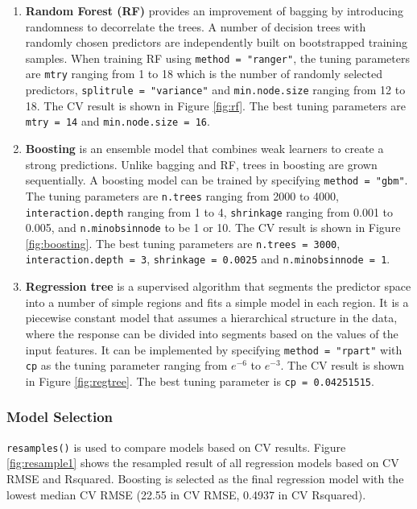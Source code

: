 \documentclass[11pt]{article}
\begin{document}
\begin{enumerate}
\item \textbf{Random Forest (RF)} provides an improvement of bagging by introducing randomness to decorrelate the trees. A number of decision trees with randomly chosen predictors are independently built on bootstrapped training samples. When training RF using \texttt{method = "ranger"}, the tuning parameters are \texttt{mtry} ranging from 1 to 18 which is the number of randomly selected predictors, \texttt{splitrule = "variance"} and \texttt{min.node.size} ranging from 12 to 18. The CV result is shown in Figure \ref{fig:rf}. The best tuning parameters are \texttt{mtry = 14} and \texttt{min.node.size = 16}.

\item \textbf{Boosting} is an ensemble model that combines weak learners to create a strong predictions. Unlike bagging and RF, trees in boosting are grown sequentially. A boosting model can be trained by specifying \texttt{method = "gbm"}. The tuning parameters are \texttt{n.trees} ranging from 2000 to 4000, \texttt{interaction.depth} ranging from 1 to 4, \texttt{shrinkage} ranging from 0.001 to 0.005, and \texttt{n.minobsinnode} to be 1 or 10. The CV result is shown in Figure \ref{fig:boosting}. The best tuning parameters are \texttt{n.trees = 3000}, \texttt{interaction.depth = 3}, \texttt{shrinkage = 0.0025} and \texttt{n.minobsinnode = 1}.

\item \textbf{Regression tree} is a supervised algorithm that segments the predictor space into a number of simple regions and fits a simple model in each region. It is a piecewise constant model that assumes a hierarchical structure in the data, where the response can be divided into segments based on the values of the input features. It can be implemented by specifying \texttt{method = "rpart"} with \texttt{cp} as the tuning parameter ranging from $e^{-6}$ to $e^{-3}$. The CV result is shown in Figure \ref{fig:regtree}. The best tuning parameter is \texttt{cp = 0.04251515}.

\end{enumerate}
\subsubsection{Model Selection}

\texttt{resamples()} is used to compare models based on CV results. Figure \ref{fig:resample1} shows the resampled result of all regression models based on CV RMSE and Rsquared. Boosting is selected as the final regression model with the lowest median CV RMSE (22.55 in CV RMSE, 0.4937 in CV Rsquared).
\end{document}
